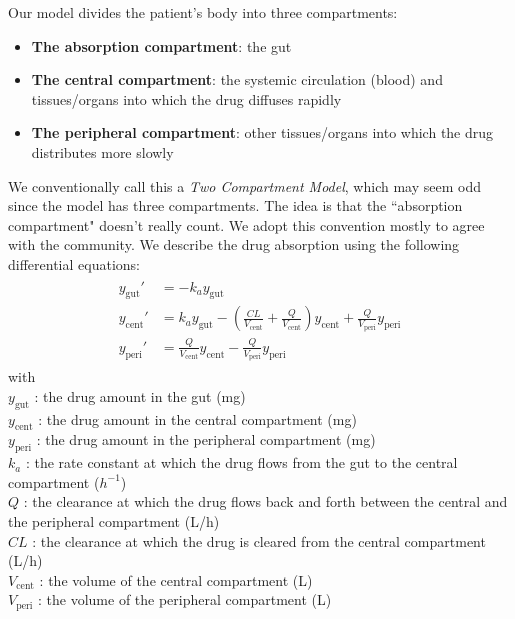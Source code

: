 \documentclass[11pt]{article}
\begin{document}
Our model divides the patient's body into three compartments:
\begin{itemize}
  \item \textbf{The absorption compartment}: the gut
  \item \textbf{The central compartment}: the systemic circulation (blood) and tissues/organs 
  into which the drug diffuses rapidly
  \item \textbf{The peripheral compartment}: other tissues/organs into which the drug 
  distributes more slowly
\end{itemize}

We conventionally call this a \textit{Two Compartment Model}, which may seem odd since
 the model has three compartments. The idea is that the ``absorption compartment" doesn't
 really count. We adopt this convention mostly to agree with the community.
%
We describe the drug absorption using the following differential equations:
%
\begin{eqnarray}
  \begin{aligned}
  y_\mathrm{gut}' &= -k_a y_\mathrm{gut} \\
  y_\mathrm{cent}' &= k_a y_\mathrm{gut} - \left(\frac{CL}{V_\mathrm{cent}} + \frac{Q}{V_\mathrm{cent}} \right) y_\mathrm{cent} +  \frac{Q}{V_\mathrm{peri}} y_\mathrm{peri} \\
  y_\mathrm{peri}' &= \frac{Q}{V_\mathrm{cent}} y_\mathrm{cent} - \frac{Q}{V_\mathrm{peri}} y_\mathrm{peri}
  \end{aligned}
  \label{eq:2Cpt}
\end{eqnarray}
%
with \\
$y_\mathrm{gut}$ : the drug amount in the gut (mg)  \\
$y_\mathrm{cent}$ : the drug amount in the central compartment (mg)  \\
$y_\mathrm{peri}$ : the drug amount in the peripheral compartment (mg)  \\
$k_a$ : the rate constant at which the drug flows from the gut to the central compartment ($h^{-1}$)  \\
$Q$ : the clearance at which the drug flows back and forth between the central and the peripheral compartment (L/h) \\ 
$CL$ : the clearance at which the drug is cleared from the central compartment (L/h)  \\
$V_\mathrm{cent}$ : the volume of the central compartment (L)  \\
$V_\mathrm{peri}$ : the volume of the peripheral compartment (L) \\
\end{document}
